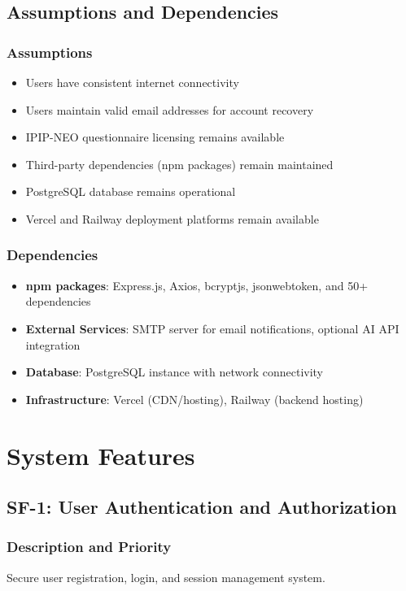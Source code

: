 \documentclass[12pt,a4paper]{article}
\begin{document}
\subsection{Assumptions and Dependencies}

\subsubsection{Assumptions}
\begin{itemize}
    \item Users have consistent internet connectivity
    \item Users maintain valid email addresses for account recovery
    \item IPIP-NEO questionnaire licensing remains available
    \item Third-party dependencies (npm packages) remain maintained
    \item PostgreSQL database remains operational
    \item Vercel and Railway deployment platforms remain available
\end{itemize}

\subsubsection{Dependencies}
\begin{itemize}
    \item \textbf{npm packages}: Express.js, Axios, bcryptjs, jsonwebtoken, and 50+ dependencies
    \item \textbf{External Services}: SMTP server for email notifications, optional AI API integration
    \item \textbf{Database}: PostgreSQL instance with network connectivity
    \item \textbf{Infrastructure}: Vercel (CDN/hosting), Railway (backend hosting)
\end{itemize}

\newpage
\section{System Features}

\subsection{SF-1: User Authentication and Authorization}

\subsubsection{Description and Priority}
Secure user registration, login, and session management system.
\end{document}
